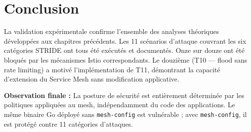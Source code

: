 \section*{Conclusion}

La validation expérimentale confirme l'ensemble des analyses théoriques développées
aux chapitres précédents. Les 11 scénarios d'attaque couvrant les six catégories
STRIDE ont tous été exécutés et documentés. Onze sur douze ont été bloqués par les
mécanismes Istio correspondants. Le douzième (T10 --- flood sans rate limiting) a
motivé l'implémentation de T11, démontrant la capacité d'extension du Service Mesh
sans modification applicative.

\textbf{Observation finale :} La posture de sécurité est entièrement déterminée
par les politiques appliquées au mesh, indépendamment du code des applications.
Le même binaire Go déployé sans \texttt{mesh-config} est vulnérable ; avec
\texttt{mesh-config}, il est protégé contre 11 catégories d'attaques.